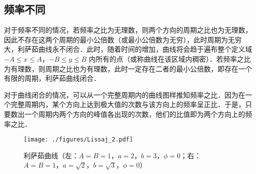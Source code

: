 \subsection{频率不同}
对于频率不同的情况，若频率之比为无理数，则两个方向的周期之比也为无理数，因此不存在这两个周期的最小公倍数（或最小公倍数为无穷），此时周期为无穷大，利萨茹曲线永不闭合．此时，随着时间的增加，曲线将会趋于遍布整个定义域 $-A\leqslant x \leqslant A$，$-B \leqslant y \leqslant B$ 内所有的点（或称曲线在该区域内稠密）．若频率之比为有理数，则周期之比也为有理数，此时一定存在二者的最小公倍数，即存在一个有限的周期，利萨茹曲线闭合．

对于曲线闭合的情况，可以从一个完整周期内的曲线图样推知频率之比．因为在一个完整周期内，某个方向上达到极大值的次数与该方向上的频率呈正比．于是，只要数出一个周期内两个方向的峰值各出现的次数，他们的比值即为两个方向上的频率之比．
\begin{figure}[ht]
\centering
\texttt{[image: ./figures/Lissaj\_2.pdf]}
\caption{利萨茹曲线（左：$A=B=1$，$a=2$，$b=3$，$\phi=0$；右：$A=B=1$，$a=\sqrt 2$，$b=\sqrt 3$，$\phi=0$）} \label{Lissaj_fig2}
\end{figure}
